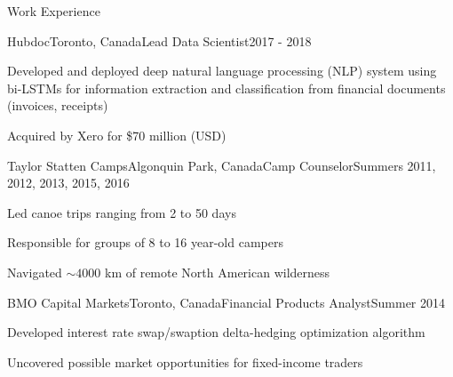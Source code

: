 \documentclass{resume} %
\begin{document}
\begin{rSection}{Work Experience}
\begin{rSubsection}{Hubdoc}{Toronto, Canada}{Lead Data Scientist}{2017 - 2018}
	\item Developed and deployed deep natural language processing (NLP) system using bi-LSTMs for information extraction and classification from financial documents (invoices, receipts)
	\item Acquired by Xero for \$70 million (USD)
\end{rSubsection}
\begin{rSubsection}{Taylor Statten Camps}{Algonquin Park, Canada}{Camp Counselor}{Summers 2011, 2012, 2013, 2015, 2016}
	\item Led canoe trips ranging from 2 to 50 days
	\item Responsible for groups of 8 to 16 year-old campers
	\item Navigated ${\sim}4000$ km of remote North American wilderness
\end{rSubsection}
\begin{rSubsection}{BMO Capital Markets}{Toronto, Canada}{Financial Products Analyst}{Summer 2014}
	\item Developed interest rate swap/swaption delta-hedging optimization algorithm
	\item Uncovered possible market opportunities for fixed-income traders
\end{rSubsection}

\end{rSection}

\end{document}
